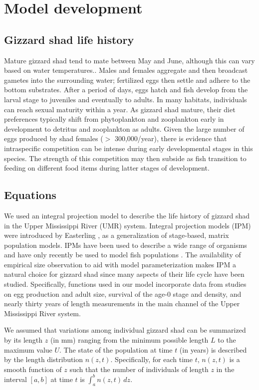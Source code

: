 \documentclass[preprint,review,12pt,authoryear]{elsarticle}
\def\ds{\displaystyle}
\begin{document}
\section{Model development}
\subsection{Gizzard shad life history}
Mature gizzard shad tend to mate between May and June, although this can vary based on water temperatures.. 
Males and females aggregate and then broadcast gametes into the surrounding water; fertilized eggs then settle and adhere to the bottom substrates. 
After a period of days, eggs hatch and fish develop from the larval stage to juveniles and eventually to adults. 
In many habitats, individuals can reach sexual maturity within a year. 
As gizzard shad mature, their diet preferences typically shift from phytoplankton and zooplankton early in development to detritus and zooplankton as adults. 
Given the large number of eggs produced by shad females ($>$ 300,000/year), there is evidence that intraspecific competition can be intense during early developmental stages in this species. 
The strength of this competition may then subside as fish transition to feeding on different food items during latter stages of development.   

\subsection{Equations}
We used an integral projection model to describe the life history of gizzard shad in the Upper Mississippi River (UMR) system. 
Integral projection models (IPM) were introduced by Easterling \citep{easterling2000size}, as a generalization of stage-based, matrix population models. 
IPMs have been used to describe a wide range of organisms \citep{ellner2016data, merow2014advancing, rees2014building} and have only recently be used to model fish populations \citep{erickson2017integral, liao2019dynamic, white2016fitting, pollesch2022developing}.
The availability of empirical size observation to aid with model parameterization makes IPM a natural choice for gizzard shad since many aspects of their life cycle have been studied. 
Specifically, functions used in our model incorporate data from studies on egg production and adult size,  survival of the age-0 stage and density, and nearly thirty years of length measurements in the main channel of the Upper Mississippi River system.

We assumed that variations among individual gizzard shad can be summarized by its length $z$ (in mm) ranging from the minimum possible length $L$ to the maximum value $U$. 
The state of the population at time $t$ (in years) is described by the length distribution $n(z,t)$. 
Specifically, for each time $t$, $n(z,t)$ is a smooth function of $z$ such that the number of individuals of length $z$ in the interval $[a,b]$ at time $t$ is $\ds \int_a^b n(z,t) \, dz$. 
\end{document}
